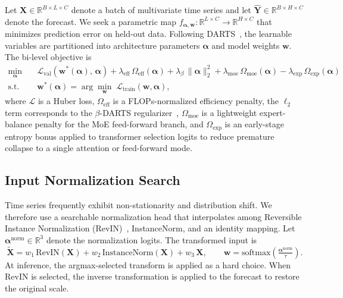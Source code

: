 Let $\mathbf{X} \in \mathbb{R}^{B \times L \times C}$ denote a batch of
multivariate time series and let
$\hat{\mathbf{Y}} \in \mathbb{R}^{B \times H \times C}$ denote the forecast.
We seek a parametric map
$f_{\boldsymbol{\alpha},\boldsymbol{w}} : \mathbb{R}^{L \times C}
\rightarrow \mathbb{R}^{H \times C}$ that minimizes prediction error on
held-out data. Following DARTS~\citep{liu2019darts}, the learnable variables
are partitioned into architecture parameters $\boldsymbol{\alpha}$ and model
weights $\boldsymbol{w}$. The bi-level objective is
%
\begin{align}
    \min_{\boldsymbol{\alpha}} \quad
    & \mathcal{L}_{\mathrm{val}}\!\left(
        \boldsymbol{w}^*(\boldsymbol{\alpha}),\, \boldsymbol{\alpha}
      \right)
      + \lambda_{\mathrm{eff}}\,\Omega_{\mathrm{eff}}(\boldsymbol{\alpha})
      + \lambda_{\beta}\,\lVert \boldsymbol{\alpha} \rVert_2^2
      + \lambda_{\mathrm{moe}}\,\Omega_{\mathrm{moe}}(\boldsymbol{\alpha})
      - \lambda_{\mathrm{exp}}\,\Omega_{\mathrm{exp}}(\boldsymbol{\alpha})
    \label{eq:outer} \\
    \text{s.t.} \quad
    & \boldsymbol{w}^*(\boldsymbol{\alpha}) =
      \arg\min_{\boldsymbol{w}}\;
      \mathcal{L}_{\mathrm{train}}(\boldsymbol{w}, \boldsymbol{\alpha}),
    \label{eq:inner}
\end{align}
%
where $\mathcal{L}$ is a Huber loss, $\Omega_{\mathrm{eff}}$ is a
FLOPs-normalized efficiency penalty, the $\ell_2$ term corresponds to the
$\beta$-DARTS regularizer~\citep{ye2022betadarts},
$\Omega_{\mathrm{moe}}$ is a lightweight expert-balance penalty for the MoE
feed-forward branch, and $\Omega_{\mathrm{exp}}$ is an early-stage entropy
bonus applied to transformer selection logits to reduce premature collapse to
a single attention or feed-forward mode.

\subsection{Input Normalization Search}
\label{sec:norm}

Time series frequently exhibit non-stationarity and distribution shift. We
therefore use a searchable normalization head that interpolates among
Reversible Instance Normalization (RevIN)~\citep{kim2021reversible},
InstanceNorm, and an identity mapping. Let
$\boldsymbol{\alpha}^{\mathrm{norm}} \in \mathbb{R}^{3}$ denote the
normalization logits. The transformed input is
%
\begin{equation}
    \tilde{\mathbf{X}} =
      w_1\,\mathrm{RevIN}(\mathbf{X}) +
      w_2\,\mathrm{InstanceNorm}(\mathbf{X}) +
      w_3\,\mathbf{X},
    \qquad
    \mathbf{w} = \mathrm{softmax}\!\left(
      \tfrac{\boldsymbol{\alpha}^{\mathrm{norm}}}{\tau}\right).
    \label{eq:norm}
\end{equation}
%
At inference, the argmax-selected transform is applied as a hard choice. When
RevIN is selected, the inverse transformation is applied to the forecast to
restore the original scale.


